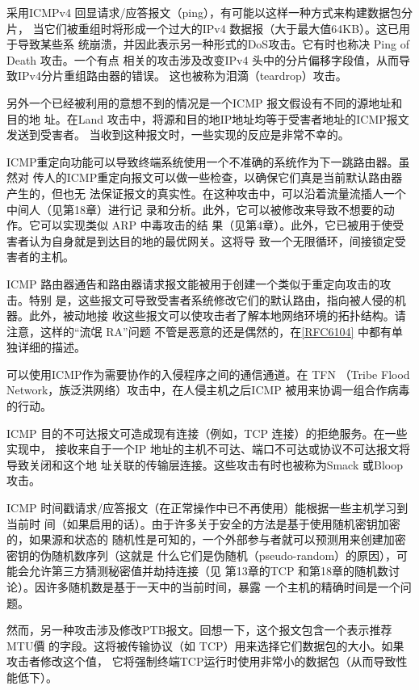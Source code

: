 采用ICMPv4 回显请求/应答报文（ping），有可能以这样一种方式来构建数据包分片，
当它们被重组时将形成一个过大的IPv4 数据报（大于最大值64KB）。这已用于导致某些系
统崩溃，并因此表示另一种形式的DoS攻击。它有时也称决 Ping of Death 攻击。一个有点
相关的攻击涉及改变IPv4 头中的分片偏移字段值，从而导致IPv4分片重组路由器的错误。
这也被称为泪滴（teardrop）攻击。

另外一个已经被利用的意想不到的情况是一个ICMP 报文假设有不同的源地址和目的地
址。在Land 攻击中，将源和目的地IP地址均等于受害者地址的ICMP报文发送到受害者。
当收到这种报文时，一些实现的反应是非常不幸的。

ICMP重定向功能可以导致终端系统使用一个不准确的系统作为下一跳路由器。虽然对
传人的ICMP重定向报文可以做一些检查，以确保它们真是当前默认路由器产生的，但也无
法保证报文的真实性。在这种攻击中，可以沿着流量流插人一个中间人（见第18章）进行记
录和分析。此外，它可以被修改来导致不想要的动作。它可以实现类似 ARP 中毒攻击的结
果（见第4章）。此外，它已被用于使受害者认为自身就是到达目的地的最优网关。这将导
致一个无限循环，间接锁定受害者的主机。

ICMP 路由器通告和路由器请求报文能被用于创建一个类似于重定向攻击的攻击。特别
是，这些报文可导致受害者系统修改它们的默认路由，指向被人侵的机器。此外，被动地接
收这些报文可以使攻击者了解本地网络环境的拓扑结构。请注意，这样的“流氓 RA”问题
不管是恶意的还是偶然的，在\href{https://www.rfc-editor.org/rfc/rfc6104}{[RFC6104]} 中都有单独详细的描述。

可以使用ICMP作为需要协作的入侵程序之间的通信通道。在 TFN （Tribe Flood
Network，族泛洪网络）攻击中，在人侵主机之后ICMP 被用来协调一组合作病毒的行动。

ICMP 目的不可达报文可造成现有连接（例如，TCP 连接）的拒绝服务。在一些实现中，
接收来自于一个IP 地址的主机不可达、端口不可达或协议不可达报文将导致关闭和这个地
址关联的传输层连接。这些攻击有时也被称为Smack 或Bloop 攻击。

ICMP 时间戳请求/应答报文（在正常操作中已不再使用）能根据一些主机学习到当前时
间（如果启用的话）。由于许多关于安全的方法是基于使用随机密钥加密的，如果源和状态的
随机性是可知的，一个外部参与者就可以预测用来创建加密密钥的伪随机数序列（这就是
什么它们是伪随机（pseudo-random）的原因），可能会允许第三方猜测秘密值并劫持连接（见
第13章的TCP 和第18章的随机数讨论）。因许多随机数是基于一天中的当前时间，暴露
一个主机的精确时间是一个问题。

然而，另一种攻击涉及修改PTB报文。回想一下，这个报文包含一个表示推荐MTU價
的字段。这将被传输协议（如 TCP）用来选择它们数据包的大小。如果攻击者修改这个值，
它将强制终端TCP运行时使用非常小的数据包（从而导致性能低下）。

